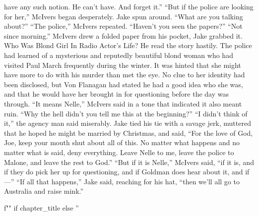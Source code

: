 \documentclass{novel}
\begin{document}
have any such notion. He can’t have. And forget it.” “But if the police are looking for her,” McIvers began desperately. Jake spun around. “What are you talking about?” “The police,” McIvers repeated. “Haven’t you seen the papers?” “Not since morning.” McIvers drew a folded paper from his pocket, Jake grabbed it. Who Was Blond Girl In Radio Actor’s Life? He read the story hastily. The police had learned of a mysterious and reputedly beautiful blond woman who had visited Paul March frequently during the winter. It was hinted that she might have more to do with his murder than met the eye. No clue to her identity had been disclosed, but Von Flanagan had stated he had a good idea who she was, and that he would have her brought in for questioning before the day was through. “It means Nelle,” McIvers said in a tone that indicated it also meant ruin. “Why the hell didn’t you tell me this at the beginning?” “I didn’t think of it,” the agency man said miserably. Jake tied his tie with a savage jerk, muttered that he hoped he might be married by Christmas, and said, “For the love of God, Joe, keep your mouth shut about all of this. No matter what happens and no matter what is said, deny everything. Leave Nelle to me, leave the police to Malone, and leave the rest to God.” “But if it is Nelle,” McIvers said, “if it is, and if they do pick her up for questioning, and if Goldman does hear about it, and if—” “If all that happens,” Jake said, reaching for his hat, “then we’ll all go to Australia and raise mink.”

\begin{ChapterStart}
\vspace{3\nbs}
f"" if chapter_title else ''
\end{ChapterStart}
\end{document}
